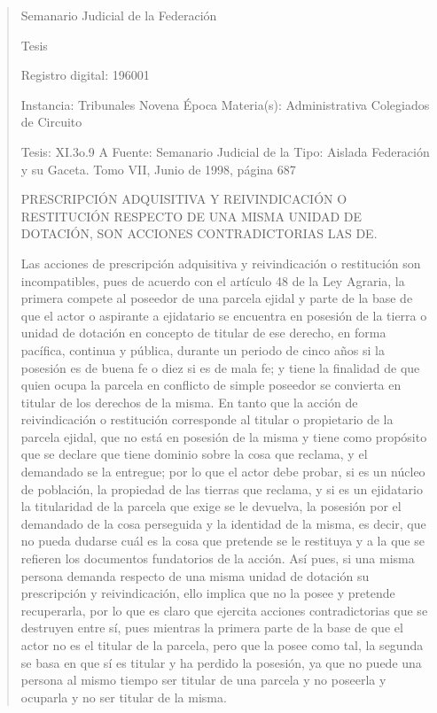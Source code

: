 \documentclass[11pt,a4paper]{article}
\begin{document}
\begin{quote}
                                                   Semanario Judicial de la Federación

                                                  Tesis

 Registro digital: 196001

 Instancia: Tribunales            Novena Época                          Materia(s): Administrativa
 Colegiados de Circuito

 Tesis: XI.3o.9 A                 Fuente: Semanario Judicial de la      Tipo: Aislada
                                  Federación y su Gaceta.
                                  Tomo VII, Junio de 1998, página
                                  687


PRESCRIPCIÓN ADQUISITIVA Y REIVINDICACIÓN O RESTITUCIÓN RESPECTO DE UNA
MISMA UNIDAD DE DOTACIÓN, SON ACCIONES CONTRADICTORIAS LAS DE.


Las acciones de prescripción adquisitiva y reivindicación o restitución son incompatibles, pues de
acuerdo con el artículo 48 de la Ley Agraria, la primera compete al poseedor de una parcela ejidal y
parte de la base de que el actor o aspirante a ejidatario se encuentra en posesión de la tierra o
unidad de dotación en concepto de titular de ese derecho, en forma pacífica, continua y pública,
durante un periodo de cinco años si la posesión es de buena fe o diez si es de mala fe; y tiene la
finalidad de que quien ocupa la parcela en conflicto de simple poseedor se convierta en titular de los
derechos de la misma. En tanto que la acción de reivindicación o restitución corresponde al titular o
propietario de la parcela ejidal, que no está en posesión de la misma y tiene como propósito que se
declare que tiene dominio sobre la cosa que reclama, y el demandado se la entregue; por lo que el
actor debe probar, si es un núcleo de población, la propiedad de las tierras que reclama, y si es un
ejidatario la titularidad de la parcela que exige se le devuelva, la posesión por el demandado de la
cosa perseguida y la identidad de la misma, es decir, que no pueda dudarse cuál es la cosa que
pretende se le restituya y a la que se refieren los documentos fundatorios de la acción. Así pues, si
una misma persona demanda respecto de una misma unidad de dotación su prescripción y
reivindicación, ello implica que no la posee y pretende recuperarla, por lo que es claro que ejercita
acciones contradictorias que se destruyen entre sí, pues mientras la primera parte de la base de
que el actor no es el titular de la parcela, pero que la posee como tal, la segunda se basa en que sí
es titular y ha perdido la posesión, ya que no puede una persona al mismo tiempo ser titular de una
parcela y no poseerla y ocuparla y no ser titular de la misma.


\end{quote}
\end{document}
